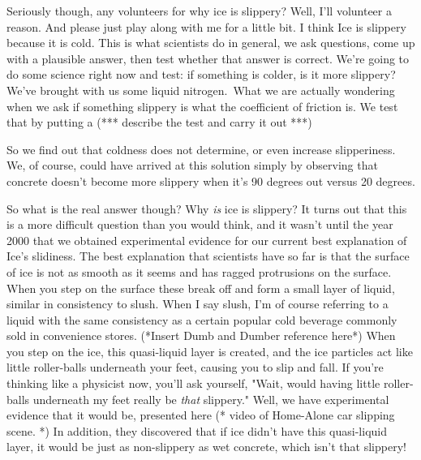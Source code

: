 \documentclass[12pt]{article}
\begin{document}
Seriously
though, any volunteers for why ice is slippery? Well, I'll volunteer a reason. And please 
just play along with me for a little bit. I think Ice is slippery because it is cold.
This is what scientists do in general, we ask questions, come up with a plausible answer, 
then test whether that answer is correct. We're going to do some science right now 
and test: if something is colder, is it more slippery? We've brought with us some 
liquid nitrogen. What we are actually wondering when we ask if something slippery
is what the coefficient of friction is. We test that by putting a
(*** describe the test and carry it out ***)

So we find out that coldness does not determine, or even increase slipperiness.
We, of course, could have arrived at this solution simply by observing that
concrete doesn't become more slippery when it's 90 degrees out versus 20 degrees. 

So what is the real answer though? Why \emph{is} ice is slippery? 
It turns out that this is a more difficult question than you would think, and
it wasn't until the year 2000 that we obtained experimental evidence for our 
current best explanation of Ice's slidiness. The best explanation that 
scientists have so far is that the surface of ice is not as smooth as it seems and
has ragged protrusions on the surface. When you step on the surface these break off and 
form a small layer of liquid, similar in consistency to slush. When I say slush, I'm 
of course referring to a liquid with the same consistency as a certain popular
cold beverage commonly sold in convenience stores. (*Insert Dumb and Dumber reference 
here*) 
When you step on the ice,  this quasi-liquid layer is created, and the ice particles 
act like little roller-balls underneath your feet, causing you to slip and fall. 
If you're thinking like a physicist now, you'll ask yourself, "Wait, would having
little roller-balls underneath my feet really be \emph{that} slippery." Well,
we have experimental evidence that it would be, presented here (* video of Home-Alone
car slipping scene. *) In addition, they discovered that
if ice didn't have this quasi-liquid layer, it would be just as non-slippery as wet concrete, which 
isn't that slippery!
\end{document}
